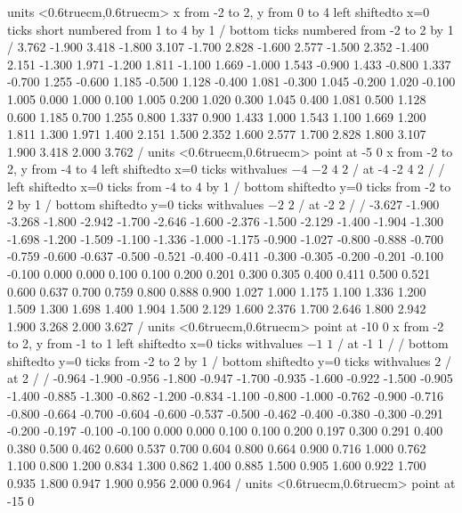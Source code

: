 \figure
\vbox{\beginpicture
\normalgraphs
\eightpoint
\setcoordinatesystem units <0.6truecm,0.6truecm>
\setplotarea x from -2 to 2, y from 0 to 4
\axis left shiftedto x=0 ticks short numbered from 1 to 4 by 1 /
\axis bottom ticks numbered from -2 to 2 by 1 /
 3.762 -1.900 3.418 -1.800 3.107 -1.700 2.828 -1.600 2.577 
-1.500 2.352 -1.400 2.151 -1.300 1.971 -1.200 1.811 -1.100 1.669 
-1.000 1.543 -0.900 1.433 -0.800 1.337 -0.700 1.255 -0.600 1.185 
-0.500 1.128 -0.400 1.081 -0.300 1.045 -0.200 1.020 -0.100 1.005 
0.000 1.000 0.100 1.005 0.200 1.020 0.300 1.045 0.400 1.081 
0.500 1.128 0.600 1.185 0.700 1.255 0.800 1.337 0.900 1.433 
1.000 1.543 1.100 1.669 1.200 1.811 1.300 1.971 1.400 2.151 
1.500 2.352 1.600 2.577 1.700 2.828 1.800 3.107 1.900 3.418 
2.000 3.762 /
\setcoordinatesystem units <0.6truecm,0.6truecm> point at -5 0
\setplotarea x from -2 to 2, y from -4 to 4
\axis left shiftedto x=0 ticks withvalues {$-4$} {$-2$}
{$4$} {$2$} / at -4  -2  4 2 / /
\axis left shiftedto x=0 ticks from -4 to 4 by 1 /
\axis bottom shiftedto y=0 ticks from -2 to 2 by 1 /
\axis bottom shiftedto y=0 ticks withvalues {$-2$} {$2$} / at -2 2 / /
 -3.627 -1.900 -3.268 -1.800 -2.942 -1.700 -2.646 -1.600 -2.376 
-1.500 -2.129 -1.400 -1.904 -1.300 -1.698 -1.200 -1.509 -1.100 -1.336 
-1.000 -1.175 -0.900 -1.027 -0.800 -0.888 -0.700 -0.759 -0.600 -0.637 
-0.500 -0.521 -0.400 -0.411 -0.300 -0.305 -0.200 -0.201 -0.100 -0.100 
0.000 0.000 0.100 0.100 0.200 0.201 0.300 0.305 0.400 0.411 
0.500 0.521 0.600 0.637 0.700 0.759 0.800 0.888 0.900 1.027 
1.000 1.175 1.100 1.336 1.200 1.509 1.300 1.698 1.400 1.904 
1.500 2.129 1.600 2.376 1.700 2.646 1.800 2.942 1.900 3.268 
2.000 3.627 /
\setcoordinatesystem units <0.6truecm,0.6truecm> point at -10 0
\setplotarea x from -2 to 2, y from -1 to 1
\axis left shiftedto x=0 ticks withvalues {$-1$} {$1$} / at -1 1 / /
\axis bottom shiftedto y=0 ticks from -2 to 2 by 1 /
\axis bottom shiftedto y=0 ticks withvalues {$2$} / at 2 / /
 -0.964 -1.900 -0.956 -1.800 -0.947 -1.700 -0.935 -1.600 -0.922 
-1.500 -0.905 -1.400 -0.885 -1.300 -0.862 -1.200 -0.834 -1.100 -0.800 
-1.000 -0.762 -0.900 -0.716 -0.800 -0.664 -0.700 -0.604 -0.600 -0.537 
-0.500 -0.462 -0.400 -0.380 -0.300 -0.291 -0.200 -0.197 -0.100 -0.100 
0.000 0.000 0.100 0.100 0.200 0.197 0.300 0.291 0.400 0.380 
0.500 0.462 0.600 0.537 0.700 0.604 0.800 0.664 0.900 0.716 
1.000 0.762 1.100 0.800 1.200 0.834 1.300 0.862 1.400 0.885 
1.500 0.905 1.600 0.922 1.700 0.935 1.800 0.947 1.900 0.956 
2.000 0.964 /
\setcoordinatesystem units <0.6truecm,0.6truecm> point at -15 0
}
